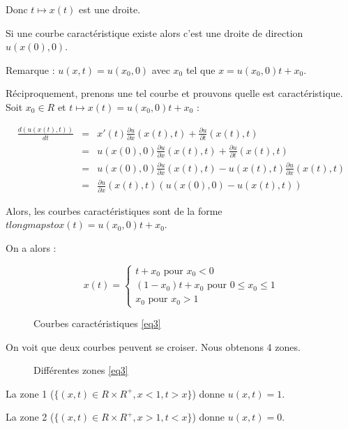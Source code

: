 \documentclass{article}
\begin{document}
Donc $t \longmapsto x(t)$ est une droite.

Si une courbe caractéristique existe alors c'est une droite de direction $u(x(0),0)$.
\newline

Remarque : $u(x,t) = u(x_0,0)$ avec $x_0$ tel que $x = u(x_0,0) t + x_0$.
\newline

Réciproquement, prenons une tel courbe et prouvons quelle est caractéristique. Soit $x_0 \in R$ et $t \longmapsto x(t) = u(x_0,0) t + x_0$ :

\begin{eqnarray*}
	\frac{d (u(x(t),t))}{dt} &=& x'(t) \frac{\partial u}{\partial x}(x(t),t) + \frac{\partial u}{\partial t}(x(t),t) \\
	&=& u(x(0),0) \frac{\partial u}{\partial x}(x(t),t) + \frac{\partial u}{\partial t}(x(t),t) \\
	&=& u(x(0),0) \frac{\partial u}{\partial x}(x(t),t) - u(x(t),t) \frac{\partial u}{\partial x}(x(t),t) \\
	&=& \frac{\partial u}{\partial x}(x(t),t) \left( u(x(0),0)-u(x(t),t) \right)
\end{eqnarray*}

Alors, les courbes caractéristiques sont de la forme $t longmapsto x(t) = u(x_0,0) t + x_0$.

On a alors :

\[
x(t) = \left\{ \begin{matrix}
	t + x_0 \text{ pour } x_0 < 0 \\
	(1-x_0) t + x_0 \text{ pour } 0 \leq x_0 \leq 1 \\
	x_0 \text{ pour } x_0 > 1
\end{matrix} \right. \]

\begin{figure}[H]
  
  \caption{Courbes caractéristiques \ref{eq3}}
\end{figure}

On voit que deux courbes peuvent se croiser. Nous obtenons 4 zones.

\begin{figure}[H]
  
  \caption{Différentes zones \ref{eq3}}
\end{figure}

La zone 1 ($\{(x,t) \in R \times R^{+}, x < 1, t > x\}$) donne $u(x,t) = 1$.

La zone 2 ($\{(x,t) \in R \times R^{+}, x > 1, t < x\}$) donne $u(x,t) = 0$.
\end{document}
